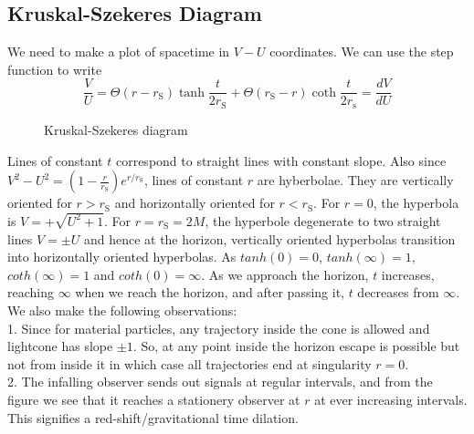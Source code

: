 ﻿\documentclass[12pt,a4paper]{article}
\begin{document}
\subsection{Kruskal-Szekeres Diagram}
We need to make a plot of spacetime in $V-U$ coordinates. We can use the step function to write
$$
\frac{V}{U}=\Theta\left(r-r_{\mathrm{S}}\right) \tanh \frac{t}{2 r_{\mathrm{S}}}+\Theta\left(r_{\mathrm{S}}-r\right) \operatorname{coth} \frac{t}{2 r_{\mathrm{s}}}=\frac{dV}{dU}
$$
\begin{figure}[H]
    \centering
    \qquad
    \caption{Kruskal-Szekeres diagram}
    \label{fig:example}
\end{figure}
Lines of constant $t$ correspond to straight lines with constant slope. Also since $V^{2}-U^{2}=\left(1-\frac{r}{r_{\mathrm{S}}}\right) e^{r / r_\mathrm{S}}$, lines of constant $r$ are hyberbolae. They are vertically oriented for $r>r_{\mathrm{S}}$ and horizontally oriented for $r<r_{\mathrm{S}}$. For $r=0$, the hyperbola is $V=+\sqrt{U^{2}+1}$. For $r=r_{\mathrm{S}}=2M$, the hyperbole degenerate to two straight lines $V=\pm U$ and hence at the horizon, vertically oriented hyperbolas transition into horizontally oriented hyperbolas. As $tanh(0)=0$, $tanh(\infty)=1$, $coth(\infty)=1$ and $coth(0)=\infty$. As we approach the horizon, $t$ increases, reaching $\infty$ when we reach the horizon, and after passing it, $t$ decreases from $\infty$. We also make the following observations:\\ 
1. Since for material particles, any trajectory inside the cone is allowed and lightcone has slope $\pm 1$. So, at any point inside the horizon escape is possible but not from inside it in which case all trajectories end at singularity $r=0$.\\
2. The infalling observer sends out signals at regular intervals, and from the figure we see that it reaches a stationery observer at $r$ at ever increasing intervals. This signifies a red-shift/gravitational time dilation.
\end{document}
